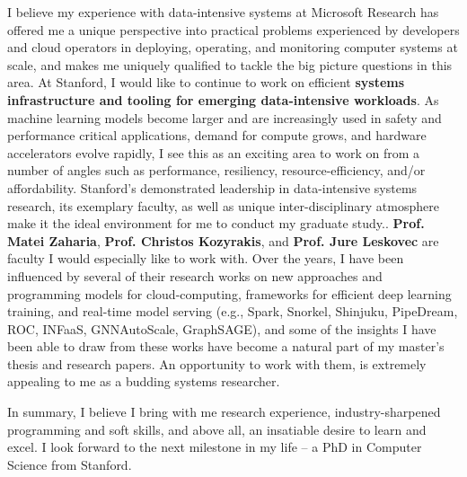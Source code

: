 \documentclass{article}
\newcommand{\schoolShort}{Stanford\xspace}
\newcommand{\school}{Stanford\xspace}
\newcommand{\profOne}{Prof. Matei Zaharia\xspace}
\newcommand{\profTwo}{Prof. Christos Kozyrakis\xspace}
\newcommand{\profThree}{Prof. Jure Leskovec\xspace}
\begin{document}

I believe my experience with data-intensive systems at Microsoft Research has offered me a unique perspective into practical problems experienced by developers and cloud operators in deploying, operating, and monitoring computer systems at scale, and makes me uniquely qualified to tackle the big picture questions in this area.
At \schoolShort, I would like to continue to work on efficient \textbf{systems infrastructure and tooling for emerging data-intensive workloads}.
As machine learning models become larger and are increasingly used in safety and performance critical applications, demand for compute grows, and hardware accelerators evolve rapidly, I see this as an exciting area to work on from a number of angles such as performance, resiliency, resource-efficiency, and/or affordability.
\schoolShort's demonstrated leadership in data-intensive systems research, its exemplary faculty, as well as unique inter-disciplinary atmosphere make it the ideal environment for me to conduct my graduate study.. 
\textbf{\profOne}, \textbf{\profTwo}, and \textbf{\profThree} are faculty I would especially like to work with. Over the years, I have been influenced by several of their research works on new approaches and programming models for cloud-computing, frameworks for efficient deep learning training, and real-time model serving (e.g., Spark, Snorkel, Shinjuku, PipeDream, ROC, INFaaS, GNNAutoScale, GraphSAGE), and some of the insights I have been able to draw from these works have become a natural part of my master's thesis and research papers. An opportunity to work with them, is extremely appealing to me as a budding systems researcher.


In summary, I believe I bring with me research experience, industry-sharpened programming and soft skills, and above all, an insatiable desire to learn and excel. I look forward to the next milestone in my life -- a PhD in Computer Science from \school. 

\vspace{0.125in}


\end{document}
